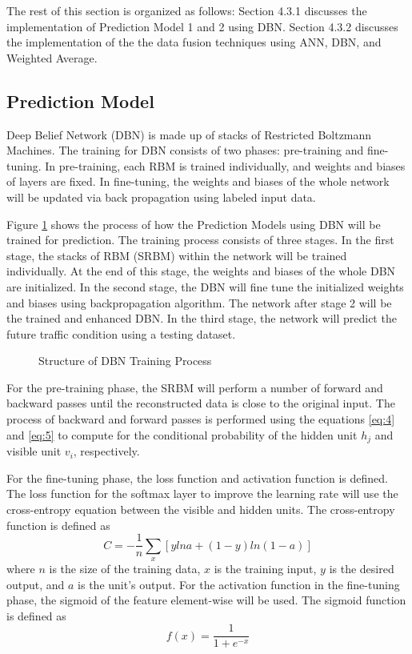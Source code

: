 The rest of this section is organized as follows: Section 4.3.1 discusses the implementation of Prediction Model 1 and 2 using DBN. Section 4.3.2 discusses the implementation of the the data fusion techniques using ANN, DBN, and Weighted Average. 

\subsection{Prediction Model}
Deep Belief Network (DBN) is made up of stacks of Restricted Boltzmann Machines. The training for DBN consists of two phases: pre-training and fine-tuning. In pre-training, each RBM is trained individually, and weights and biases of layers are fixed. In fine-tuning, the weights and biases of the whole network will be updated via back propagation using labeled input data. 

Figure \ref{fig:dbntraining} shows the process of how the Prediction Models using DBN will be trained for prediction. The training process consists of three stages. In the first stage, the stacks of RBM (SRBM) within the network will be trained individually. At the end of this stage, the weights and biases of the whole DBN are initialized. In the second stage, the DBN will fine tune the initialized weights and biases using backpropagation algorithm. The network after stage 2 will be the trained and enhanced DBN. In the third stage, the network will predict the future traffic condition using a testing dataset.

\begin{figure}[h]
	\centering
	\captionsetup{justification=centering}
	\caption{Structure of DBN Training Process}
	\label{fig:dbntraining}
\end{figure}

For the pre-training phase, the SRBM will perform a number of forward and backward passes until the reconstructed data is close to the original input. The process of backward and forward passes is performed using the equations \ref{eq:4} and \ref{eq:5} to compute for the conditional probability of the hidden unit $h_j$ and visible unit $v_i$, respectively. 

For the fine-tuning phase, the loss function and activation function is defined.
The loss function for the softmax layer to improve the learning rate will use the cross-entropy equation between the visible and hidden units. The cross-entropy function is defined as 
\begin{equation}
C = -\frac{1}{n}\sum_x [y ln a + (1 - y) ln (1-a)]
\end{equation}
\noindent where $n$ is the size of the training data, $x$ is the training input, $y$ is the desired output, and $a$ is the unit’s output. 
For the activation function in the fine-tuning phase, the sigmoid of the feature element-wise will be used. The sigmoid function is defined as 
\begin{equation}
f(x) = \frac{1}{1+e ^{-x}}
\end{equation}

